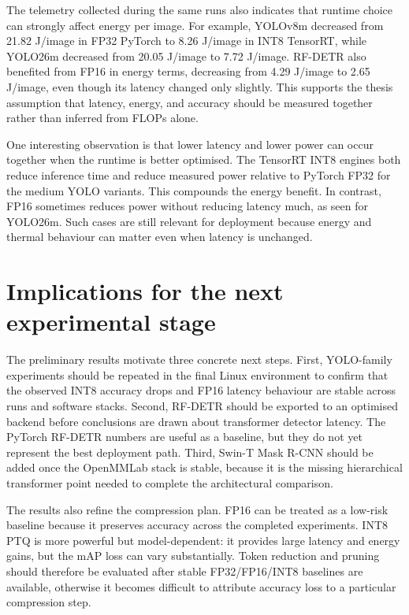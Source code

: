 \documentclass[a4paper,11pt,twoside]{report}
\theoremstyle{definition}
\begin{document}
The telemetry collected during the same runs also indicates that runtime choice can strongly affect energy per image. For example, YOLOv8m decreased from 21.82 J/image in FP32 PyTorch to 8.26 J/image in INT8 TensorRT, while YOLO26m decreased from 20.05 J/image to 7.72 J/image. RF-DETR also benefited from FP16 in energy terms, decreasing from 4.29 J/image to 2.65 J/image, even though its latency changed only slightly. This supports the thesis assumption that latency, energy, and accuracy should be measured together rather than inferred from FLOPs alone.

One interesting observation is that lower latency and lower power can occur together when the runtime is better optimised. The TensorRT INT8 engines both reduce inference time and reduce measured power relative to PyTorch FP32 for the medium YOLO variants. This compounds the energy benefit. In contrast, FP16 sometimes reduces power without reducing latency much, as seen for YOLO26m. Such cases are still relevant for deployment because energy and thermal behaviour can matter even when latency is unchanged.

\section{Implications for the next experimental stage}

The preliminary results motivate three concrete next steps. First, YOLO-family experiments should be repeated in the final Linux environment to confirm that the observed INT8 accuracy drops and FP16 latency behaviour are stable across runs and software stacks. Second, RF-DETR should be exported to an optimised backend before conclusions are drawn about transformer detector latency. The PyTorch RF-DETR numbers are useful as a baseline, but they do not yet represent the best deployment path. Third, Swin-T Mask R-CNN should be added once the OpenMMLab stack is stable, because it is the missing hierarchical transformer point needed to complete the architectural comparison.

The results also refine the compression plan. FP16 can be treated as a low-risk baseline because it preserves accuracy across the completed experiments. INT8 PTQ is more powerful but model-dependent: it provides large latency and energy gains, but the mAP loss can vary substantially. Token reduction and pruning should therefore be evaluated after stable FP32/FP16/INT8 baselines are available, otherwise it becomes difficult to attribute accuracy loss to a particular compression step.
\end{document}
